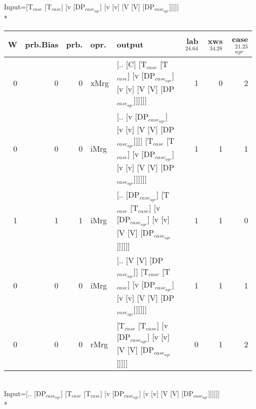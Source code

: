 \begingroup\scriptsize Input=[T$_{case}$ [T$_{case}$] [v [DP$_{case_{agr}}$] [v [v] [V [V] [DP$_{case_{agr}}$]]]]]\\*
\begin{tabularx}{\linewidth}{rrrlXrrr}
\hline
   W &   prb.Bias &   prb. & opr.   & output                                                                                                                 &   lab$^{24.64}$ &   xws$^{34.28}$ &   case$_{agr}^{21.23}$ \\
\hline
   0 &       0 &   0 & xMrg & [.. [C] [T$_{case}$ [T$_{case}$] [v [DP$_{case_{agr}}$] [v [v] [V [V] [DP$_{case_{agr}}$]]]]]]                                             &             1 &             0 &                  2 \\
   0 &       0 &   0 & iMrg & [.. [v [DP$_{case_{agr}}$] [v [v] [V [V] [DP$_{case_{agr}}$]]]] [T$_{case}$ [T$_{case}$] [v [DP$_{case_{agr}}$] [v [v] [V [V] [DP$_{case_{agr}}$]]]]]] &             1 &             1 &                  1 \\
   1 &       1 &   1 & iMrg & [.. [DP$_{case_{agr}}$] [T$_{case}$ [T$_{case}$] [v [DP$_{case_{agr}}$] [v [v] [V [V] [DP$_{case_{agr}}$]]]]]]                                   &             1 &             1 &                  0 \\
   0 &       0 &   0 & iMrg & [.. [V [V] [DP$_{case_{agr}}$]] [T$_{case}$ [T$_{case}$] [v [DP$_{case_{agr}}$] [v [v] [V [V] [DP$_{case_{agr}}$]]]]]]                           &             1 &             1 &                  1 \\
   0 &       0 &   0 & rMrg & [T$_{case}$ [T$_{case}$] [v [DP$_{case_{agr}}$] [v [v] [V [V] [DP$_{case_{agr}}$]]]]]                                                      &             0 &             1 &                  2 \\
\hline
\end{tabularx}\endgroup\\
\begingroup\scriptsize Input=[.. [DP$_{case_{agr}}$] [T$_{case}$ [T$_{case}$] [v [DP$_{case_{agr}}$] [v [v] [V [V] [DP$_{case_{agr}}$]]]]]]\\*
